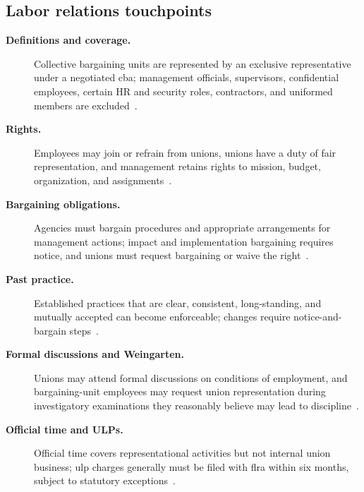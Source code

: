 \documentclass[../main.tex]{subfiles}
\begin{document}
\subsection{Labor relations touchpoints}
\begin{description}
  \item[\textbf{Definitions and coverage.}] Collective bargaining units are represented by an exclusive
  representative under a negotiated \ac{cba}; management officials, supervisors, confidential employees,
  certain HR and security roles, contractors, and uniformed members are excluded~\autocite{edo-6-1-5-labor-relations-2025}.
  \item[\textbf{Rights.}] Employees may join or refrain from unions, unions have a duty of fair
  representation, and management retains rights to mission, budget, organization, and assignments~\autocite{edo-6-1-5-labor-relations-2025}.
  \item[\textbf{Bargaining obligations.}] Agencies must bargain procedures and appropriate arrangements
  for management actions; impact and implementation bargaining requires notice, and unions must
  request bargaining or waive the right~\autocite{edo-6-1-5-labor-relations-2025}.
  \item[\textbf{Past practice.}] Established practices that are clear, consistent, long-standing, and mutually
  accepted can become enforceable; changes require notice-and-bargain steps~\autocite{edo-6-1-5-labor-relations-2025,FLRA-OKC-3-FLRA-512}.
  \item[\textbf{Formal discussions and Weingarten.}] Unions may attend formal discussions on conditions of
  employment, and bargaining-unit employees may request union representation during investigatory
  examinations they reasonably believe may lead to discipline~\autocite{edo-6-1-5-labor-relations-2025,flra-7114-representation-rights}.
  \item[\textbf{Official time and ULPs.}] Official time covers representational activities but not internal
  union business; \ac{ulp} charges generally must be filed with \ac{flra} within six months, subject to
  statutory exceptions~\autocite{edo-6-1-5-labor-relations-2025,flra-7118-ulp-filing}.
\end{description}
\end{document}

